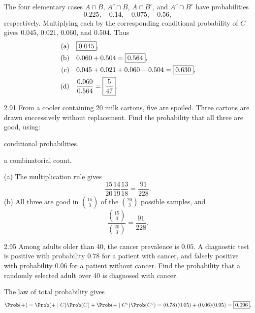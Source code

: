 \documentclass[11pt,oneside]{article}
\begin{document}
\begin{solution}
The four elementary cases $A\cap B$, $A^c\cap B$, $A\cap B^c$, and $A^c\cap B^c$ have probabilities
\[
0.225,\quad0.14,\quad0.075,\quad0.56,
\]
respectively. Multiplying each by the corresponding conditional probability of $C$ gives $0.045$, $0.021$, $0.060$, and $0.504$. Thus
\begin{align*}
\textup{(a)}\quad&\boxed{0.045},\\
\textup{(b)}\quad&0.060+0.504=\boxed{0.564},\\
\textup{(c)}\quad&0.045+0.021+0.060+0.504=\boxed{0.630},\\
\textup{(d)}\quad&\frac{0.060}{0.564}=\boxed{\frac5{47}}.
\end{align*}
\end{solution}

\begin{exercise}{2.91}
From a cooler containing 20 milk cartons, five are spoiled. Three cartons are drawn successively without replacement. Find the probability that all three are good, using:
\begin{exercisesubparts}
\item conditional probabilities.
\item a combinatorial count.
\end{exercisesubparts}
\end{exercise}

\begin{solution}
\textup{(a)} The multiplication rule gives
\[
\frac{15}{20}\frac{14}{19}\frac{13}{18}=\boxed{\frac{91}{228}}.
\]
\noindent\textup{(b)} All three are good in $\displaystyle \binom{15}{3}$ of the $\displaystyle \binom{20}{3}$ possible samples, and
\[
\frac{\binom{15}{3}}{\binom{20}{3}}=\boxed{\frac{91}{228}}.
\]
\end{solution}

\begin{exercise}{2.95}
Among adults older than 40, the cancer prevalence is $0.05$. A diagnostic test is positive with probability $0.78$ for a patient with cancer, and falsely positive with probability $0.06$ for a patient without cancer. Find the probability that a randomly selected adult over 40 is diagnosed with cancer.
\end{exercise}

\begin{solution}
The law of total probability gives
\[
\Prob(+)=\Prob(+\mid C)\Prob(C)+\Prob(+\mid C^c)\Prob(C^c)
=(0.78)(0.05)+(0.06)(0.95)=\boxed{0.096}.
\]
\end{solution}
\end{document}
